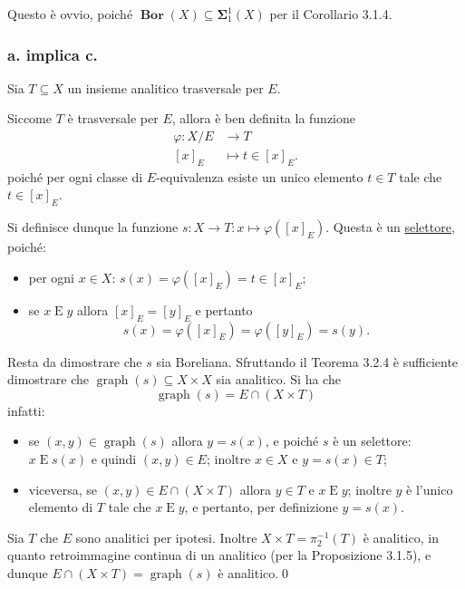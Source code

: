 \documentclass{article}
\newcommand{\1}{\mathds{1}}
\begin{document}
Questo è ovvio, poiché \(\bm{{\operatorname{Bor}}}(X) \subseteq \bm{\Sigma}_{1}^{1}(X)\) per il Corollario 3.1.4.
\subsubsection{a. implica c.}
\label{sec:org034dabe}

Sia \(T \subseteq X\) un insieme analitico trasversale per \(E\).

Siccome \(T\) è trasversale per \(E\), allora è ben definita la funzione
\begin{align*}
\varphi: X/E &\longrightarrow T\\
[x]_{E} &\longmapsto t \in [x]_{E}.
\end{align*}
poiché per ogni classe di \(E\)-equivalenza esiste un unico elemento \(t \in T\) tale che \(t \in [x]_{E}\).

Si definisce dunque la funzione \(s: X\to T: x\mapsto \varphi\left([x]_{E}\right)\). Questa è un \uline{selettore}, poiché:
\begin{itemize}
\item per ogni \(x \in X\): \(s(x) = \varphi\left([x]_{E}\right) = t \in [x]_{E}\);
\item se \(x\mathrel{E}y\) allora \([x]_{E}= [y]_{E}\) e pertanto
\begin{equation*}
  s(x) = \varphi\left([x]_{E}\right) = \varphi\left([y]_{E}\right) = s(y).
\end{equation*}
\end{itemize}

Resta da dimostrare che \(s\) sia Boreliana. Sfruttando il Teorema 3.2.4 è sufficiente dimostrare che \(\operatorname{graph}(s) \subseteq X\times X\) sia analitico. Si ha che
\begin{equation*}
\operatorname{graph}(s) = E\cap (X\times T)
\end{equation*}
infatti:
\begin{itemize}
\item se \((x,y) \in \operatorname{graph}(s)\) allora \(y=s(x)\), e poiché \(s\) è un selettore: \(x\mathrel{E} s(x)\) e quindi \((x,y) \in E\); inoltre \(x \in X\) e \(y=s(x) \in T\);
\item viceversa, se \((x,y) \in E\cap (X\times T)\) allora \(y \in T\) e \(x\mathrel{E} y\); inoltre \(y\) è l'unico elemento di \(T\) tale che \(x\mathrel{E}y\), e pertanto, per definizione \(y=s(x)\).
\end{itemize}

Sia \(T\) che \(E\) sono analitici per ipotesi. Inoltre \(X\times T = \pi_{2}^{-1}(T)\) è analitico, in quanto retroimmagine continua di un analitico (per la Proposizione 3.1.5), e dunque \(E\cap (X\times T) = \operatorname{graph}(s)\) è analitico.\qed
\end{document}
